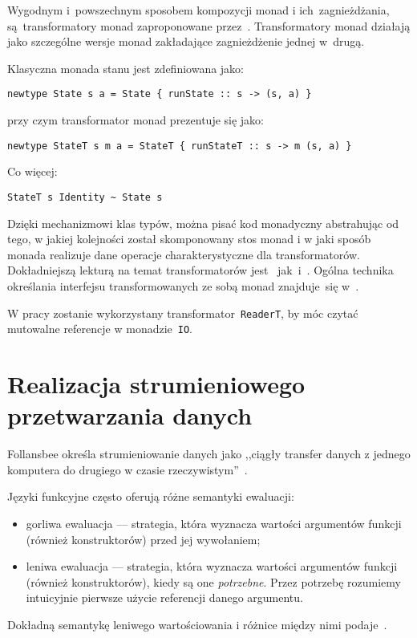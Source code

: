 \documentclass[../../praca.tex]{subfiles}
\begin{document}
Wygodnym i~powszechnym sposobem kompozycji monad i ich~zagnieżdżania, 
są~transformatory monad 
zaproponowane przez~\cite{Jones:FPO}. Transformatory monad działają
jako szczególne wersje monad zakładające zagnieżdżenie jednej w~drugą.

Klasyczna monada stanu jest zdefiniowana jako:
\begin{verbatim}
newtype State s a = State { runState :: s -> (s, a) }
\end{verbatim}
przy czym transformator monad prezentuje się jako:
\begin{verbatim}
newtype StateT s m a = StateT { runStateT :: s -> m (s, a) }
\end{verbatim}
Co więcej:
\begin{verbatim}
StateT s Identity ~ State s
\end{verbatim}

Dzięki mechanizmowi klas typów, można pisać kod monadyczny abstrahując od tego,
w jakiej kolejności został skomponowany stos monad i w jaki sposób monada
realizuje dane operacje charakterystyczne dla transformatorów. 
Dokładniejszą lekturą na temat transformatorów jest~\cite{Grabmuller:MTSS}
jak~i~\cite{Jones:FPO}. Ogólna technika określania interfejsu 
transformowanych ze sobą monad znajduje~się w~\cite{OSullivan:RWH}.

W pracy zostanie wykorzystany transformator~\texttt{ReaderT}, by móc czytać 
mutowalne referencje w monadzie~\texttt{IO}.

\section{Realizacja strumieniowego przetwarzania danych}

Follansbee określa strumieniowanie danych jako ,,ciągły transfer danych
z jednego komputera do drugiego w czasie rzeczywistym''~\cite{Fallensbee:HGSM}.

Języki funkcyjne często oferują różne semantyki ewaluacji:
\begin{itemize}
  \item gorliwa ewaluacja --- strategia, która wyznacza wartości argumentów
    funkcji (również konstruktorów) przed jej wywołaniem;
  \item leniwa ewaluacja --- strategia, która wyznacza wartości argumentów
    funkcji (również konstruktorów), kiedy są one \emph{potrzebne}.
    Przez potrzebę rozumiemy intuicyjnie pierwsze użycie referencji
    danego argumentu.
\end{itemize}
Dokładną semantykę leniwego wartościowania 
i różnice między nimi podaje~\cite{Hudak:Conception}.
\end{document}
